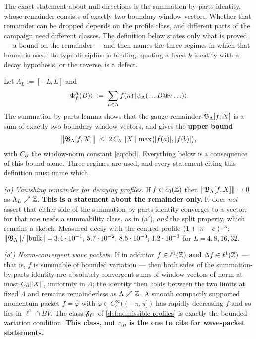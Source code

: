 The exact statement about null directions is the summation-by-parts identity,
whose remainder consists of exactly two boundary window vectors. Whether that
remainder can be dropped depends on the profile class, and different parts of
the campaign need different classes. The definition below states only what is
proved --- a bound on the remainder --- and then names the three regimes in
which that bound is used. Its type discipline is binding: quoting a fixed-$k$
identity with a decay hypothesis, or the reverse, is a defect.

\begin{definition}
\label{def:gauge-limits}
Let $\Lambda_{L} := [-L, L]$ and
\begin{equation}
  |\Phi_{f}^{\Lambda}(B)\rangle
  \; := \; \sum_{n \in \Lambda} f(n) \,
  |\psi_{\Lambda}(\ldots B@n \ldots)\rangle .
\end{equation}
The summation-by-parts lemma shows that the gauge remainder
$\mathfrak{B}_{\Lambda}[f, X]$ is a sum of exactly two boundary window vectors,
and gives the \textbf{upper bound}
\begin{equation}
  \bigl\Vert \mathfrak{B}_{\Lambda}[f,X] \bigr\Vert
  \;\le\; 2 \, C_{\partial} \, \lVert X\rVert \,
  \max\bigl(\lvert f(a)\rvert, \lvert f(b)\rvert\bigr),
  \label{eq:sbp-bound}
\end{equation}
with $C_{\partial}$ the window-norm constant \eqref{eq:cbd}. Everything below is a
consequence of this bound alone. Three regimes are used, and every statement
citing this definition must name which.

\emph{(a) Vanishing remainder for decaying profiles.} If $f \in c_{0}(\mathbb{Z})$
then $\Vert \mathfrak{B}_{\Lambda}[f,X] \Vert \to 0$ as
$\Lambda_{L} \nearrow \mathbb{Z}$. \textbf{This is a statement about the remainder
only.} It does \emph{not} assert that either side of the summation-by-parts
identity converges to a vector: for that one needs a summability class, as in
(a$'$), \emph{and} the split property, which remains a sketch. Measured decay
with the centred profile $(1+\lvert n-c\rvert)^{-3}$:
$\Vert \mathfrak{B}_{\Lambda} \Vert / \Vert \text{bulk} \Vert
 = 3.4 \cdot 10^{-1},\, 5.7 \cdot 10^{-2},\, 8.5 \cdot 10^{-3},\,
 1.2 \cdot 10^{-3}$ for $L = 4, 8, 16, 32$.

\emph{(a$'$) Norm-convergent wave packets.} If in addition $f \in \ell^{1}(\mathbb{Z})$
\textbf{and} $\Delta f \in \ell^{1}(\mathbb{Z})$ --- that is, $f$ is summable of
bounded variation --- then both sides of the summation-by-parts identity are
absolutely convergent sums of window vectors of norm at most
$C_{\partial} \lVert X\rVert$, uniformly in $\Lambda$; the identity then holds between the
two limits at fixed $\Lambda$ and remains remainderless as
$\Lambda \nearrow \mathbb{Z}$. A smooth compactly supported momentum packet
$f = \hat{\varphi}$ with $\varphi \in C_{c}^{\infty}((-\pi,\pi])$ has rapidly
decreasing $f$ and so lies in $\ell^{1} \cap BV$. The class $\mathfrak{F}_{\ell^{1}}$ of
\cref{def:admissible-profiles} is exactly the bounded-variation condition.
\textbf{This class, not $c_{0}$, is the one to cite for wave-packet
statements.}


\end{definition}
